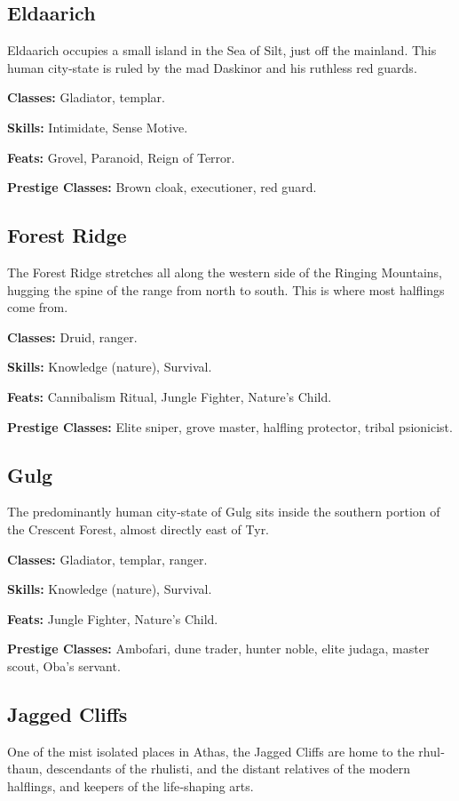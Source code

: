 \documentclass[10pt,a4paper,twocolumn]{d20}
\begin{document}
{\subsection{Eldaarich}
Eldaarich occupies a small island in the Sea of Silt, just off the mainland. This human city‐state is ruled by the mad Daskinor and his ruthless red guards.

\textbf{Classes:} Gladiator, templar.

\textbf{Skills:} Intimidate, Sense Motive.

\textbf{Feats:} Grovel, Paranoid, Reign of Terror.

\textbf{Prestige Classes:} Brown cloak, executioner, red guard.


\subsection{Forest Ridge}
The Forest Ridge stretches all along the western side of the Ringing Mountains, hugging the spine of the range from north to south. This is where most halflings come from.

\textbf{Classes:} Druid, ranger.

\textbf{Skills:} Knowledge (nature), Survival.

\textbf{Feats:} Cannibalism Ritual, Jungle Fighter, Nature’s Child.

\textbf{Prestige Classes:} Elite sniper, grove master, halfling protector, tribal psionicist.


\subsection{Gulg}
The predominantly human city‐state of Gulg sits inside the southern portion of the Crescent Forest, almost directly east of Tyr.

\textbf{Classes:} Gladiator, templar, ranger.

\textbf{Skills:} Knowledge (nature), Survival.

\textbf{Feats:} Jungle Fighter, Nature’s Child.

\textbf{Prestige Classes:} Ambofari, dune trader, hunter noble, elite judaga, master scout, Oba’s servant.


\subsection{Jagged Cliffs}
One of the mist isolated places in Athas, the Jagged Cliffs are home to the rhul‐thaun, descendants of the rhulisti, and the distant relatives of the modern halflings, and keepers of the life‐shaping arts.

}
\end{document}
